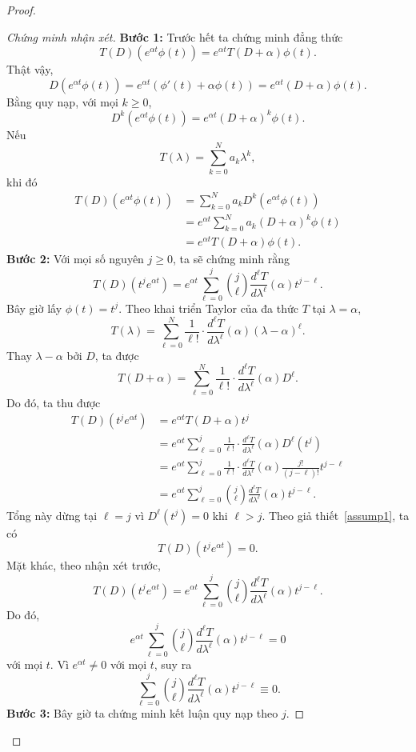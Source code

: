 ﻿\documentclass[12pt]{article}
\begin{document}
\begin{proof}
\begin{proof}[Chứng minh nhận xét]
\textbf{Bước 1:} Trước hết ta chứng minh đẳng thức
\[
 T(D)(e^{\alpha t}\phi(t))
 =
 e^{\alpha t}T(D + \alpha)\phi(t).
\]
Thật vậy,
\[
 D(e^{\alpha t}\phi(t))
 =
 e^{\alpha t}(\phi'(t) + \alpha\phi(t))
 =
 e^{\alpha t}(D + \alpha)\phi(t).
\]
Bằng quy nạp, với mọi $k\ge0$,
\[
 D^k(e^{\alpha t}\phi(t))
 =
 e^{\alpha t}(D + \alpha)^k\phi(t).
\]
Nếu
\[
 T(\lambda) = \sum_{k = 0}^{N}a_k\lambda^k,
\]
khi đó
\[
\begin{aligned}
 T(D)(e^{\alpha t}\phi(t))
 & =
 \sum_{k = 0}^{N}a_kD^k(e^{\alpha t}\phi(t))\\
 & =
 e^{\alpha t}\sum_{k = 0}^{N}a_k(D + \alpha)^k\phi(t)\\
 & =
 e^{\alpha t}T(D + \alpha)\phi(t).
\end{aligned}
\]
\textbf{Bước 2: }Với mọi số nguyên $j\ge 0$, ta sẽ chứng minh rằng
\[
 T(D)(t^j e^{\alpha t})
 =
 e^{\alpha t}
 \sum_{\ell = 0}^{j}
 \binom{j}{\ell}
 \frac{d^\ell T}{d\lambda^\ell}(\alpha)
 t^{j - \ell}.
\]
Bây giờ lấy $\phi(t) = t^j$. Theo khai triển Taylor của đa thức $T$ tại $\lambda = \alpha$,
\[
 T(\lambda)
 =
 \sum_{\ell = 0}^{N}
 \frac{1}{\ell!} \cdot \frac{d^\ell T}{d\lambda^\ell}(\alpha)
 (\lambda - \alpha)^\ell.
\]
Thay $\lambda - \alpha$ bởi $D$, ta được
\[
 T(D + \alpha)
 =
 \sum_{\ell = 0}^{N}
 \frac{1}{\ell!} \cdot \frac{d^\ell T}{d\lambda^\ell}(\alpha)
 D^\ell.
\]
Do đó, ta thu được
\[
\begin{aligned}
 T(D)(t^j e^{\alpha t})
 & =
 e^{\alpha t}T(D + \alpha)t^j\\
 & =
 e^{\alpha t}
 \sum_{\ell = 0}^{j}
 \frac{1}{\ell!} \cdot \frac{d^\ell T}{d\lambda^\ell}(\alpha)
 D^\ell(t^j)\\
 & =
 e^{\alpha t}
 \sum_{\ell = 0}^{j}
 \frac{1}{\ell!} \cdot \frac{d^\ell T}{d\lambda^\ell}(\alpha)
 \frac{j!}{(j - \ell)!}t^{j - \ell}\\
 & =
 e^{\alpha t}
 \sum_{\ell = 0}^{j}
 \binom{j}{\ell}
 \frac{d^\ell T}{d\lambda^\ell}(\alpha)
 t^{j - \ell}.
\end{aligned}
\]
Tổng này dừng tại $\ell = j$ vì $D^\ell(t^j) = 0$ khi $\ell > j$. Theo giả thiết~\eqref{assump1}, ta có
\[
 T(D)(t^j e^{\alpha t}) = 0.
\]
Mặt khác, theo nhận xét trước,
\[
 T(D)(t^j e^{\alpha t})
 =
 e^{\alpha t}
 \sum_{\ell = 0}^{j}
 \binom{j}{\ell}
 \frac{d^\ell T}{d\lambda^\ell}(\alpha)
 t^{j - \ell}.
\]
Do đó,
\[
 e^{\alpha t}
 \sum_{\ell = 0}^{j}
 \binom{j}{\ell}
 \frac{d^\ell T}{d\lambda^\ell}(\alpha)
 t^{j - \ell}
 =
 0
\]
với mọi $t$. Vì $e^{\alpha t} \neq 0$ với mọi $t$, suy ra
\[
 \sum_{\ell = 0}^{j}
 \binom{j}{\ell}
 \frac{d^\ell T}{d\lambda^\ell}(\alpha)
 t^{j - \ell}
 \equiv 0.
\]
\textbf{Bước 3:} Bây giờ ta chứng minh kết luận quy nạp theo $j$.


\end{proof}
\end{proof}
\end{document}
